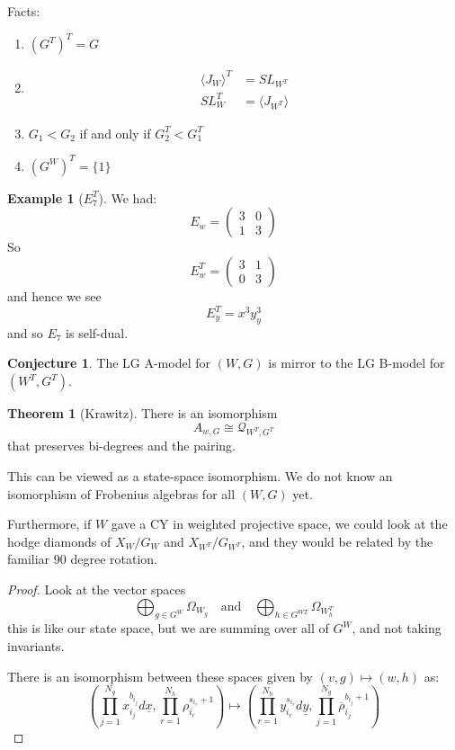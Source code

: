 \documentclass{amsart}
\theoremstyle{definition}
\newtheorem{theorem}[dummy]{Theorem}
\newtheorem{example}[dummy]{Example}
\newtheorem{conjecture}[dummy]{Conjecture}
\begin{document}
Facts:
\begin{enumerate}
\item $(G^T)^T=G$
\item \begin{align*}
\langle J_W\rangle^T&=SL_{W^T}\\
SL_W^T&=\langle J_{W^T}\rangle 
\end{align*}
\item $G_1<G_2$ if and only if $G_2^T<G_1^T$
\item $(G^W)^T=\{ 1\}$
\end{enumerate}

\begin{example}[$E_7^T$]
We had:
$$E_w=\begin{pmatrix} 3 & 0 \\ 1 & 3 
\end{pmatrix}$$
So
$$E_w^T=\begin{pmatrix} 3 & 1 \\ 0 & 3 
\end{pmatrix}$$
and hence we see
$$E_y^T=x^3y_y^3$$
and so $E_7$ is self-dual.
\end{example}

\begin{conjecture}
The LG A-model for $(W,G)$ is mirror to the LG B-model for $(W^T, G^T)$.
\end{conjecture}

\begin{theorem}[Krawitz]
There is an isomorphism 
$$A_{w,G}\cong \mathcal{Q}_{W^T, G^T}$$
that preserves bi-degrees and the pairing.
\end{theorem}
This can be viewed as a state-space isomorphism.  We do not know an isomorphism of Frobenius algebras for all $(W,G)$ yet.

Furthermore, if $W$ gave a CY in weighted projective space, we could look at the hodge diamonds of $X_W/G_W$ and $X_{W^T}/G_{W^T}$, and they would be related by the familiar 90 degree rotation.

\begin{proof}
Look at the vector spaces
$$\bigoplus_{g\in G^W} \Omega_{W_g} \quad\text{and}\quad \bigoplus_{h\in G^{WT}}\Omega_{W_h^T}$$
this is like our state space, but we are summing over all of $G^W$, and not taking invariants.

There is an isomorphism between these spaces given by $(v,g)\mapsto (w, h)$ as:
$$\left(\prod_{j=1}^{N_g}x_{i_j}^{b_{i_j}}d\underline{x},\prod_{r=1}^{N_h} \rho_{i_r}^{s_{i_r}+1}\right)\mapsto \left(\prod_{r=1}^{N_h} y_{i_r}^{s_{i_r}}d\underline{y},\prod_{j=1}^{N_g}\overline{\rho}_{i_j}^{b_{i_j}+1}\right)$$
\end{proof}
\end{document}
